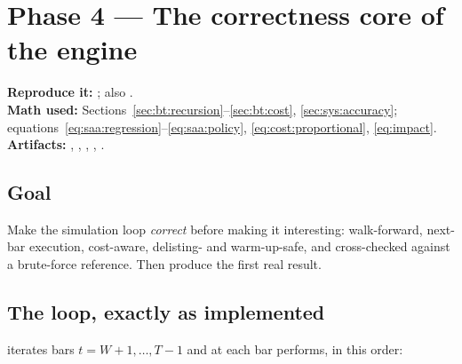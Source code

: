 \section{Phase 4 --- The correctness core of the engine}
\label{ch:phase4}

\textbf{Reproduce it:} ; also .\\
\textbf{Math used:} Sections~\ref{sec:bt:recursion}--\ref{sec:bt:cost},
\ref{sec:sys:accuracy}; equations~\eqref{eq:saa:regression}--\eqref{eq:saa:policy},
\eqref{eq:cost:proportional}, \eqref{eq:impact}.\\
\textbf{Artifacts:} ,
, ,
,
.

\subsection{Goal}

Make the simulation loop \emph{correct} before making it interesting: walk-forward,
next-bar execution, cost-aware, delisting- and warm-up-safe, and cross-checked against a
brute-force reference. Then produce the first real result.

\subsection{The loop, exactly as implemented}

 iterates bars $t=W+1,\dots,T-1$ and at each bar
performs, in this order:

